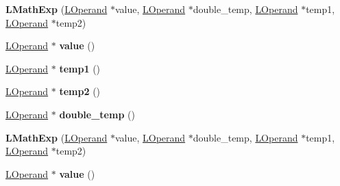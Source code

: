 \begin{DoxyCompactItemize}
\item 
{\bfseries L\+Math\+Exp} (\hyperlink{classv8_1_1internal_1_1_l_operand}{L\+Operand} $\ast$value, \hyperlink{classv8_1_1internal_1_1_l_operand}{L\+Operand} $\ast$double\+\_\+temp, \hyperlink{classv8_1_1internal_1_1_l_operand}{L\+Operand} $\ast$temp1, \hyperlink{classv8_1_1internal_1_1_l_operand}{L\+Operand} $\ast$temp2)\hypertarget{classv8_1_1internal_1_1_l_math_exp_a558e5fb429ca96f45fce9f078a8fa0f6}{}\label{classv8_1_1internal_1_1_l_math_exp_a558e5fb429ca96f45fce9f078a8fa0f6}

\item 
\hyperlink{classv8_1_1internal_1_1_l_operand}{L\+Operand} $\ast$ {\bfseries value} ()\hypertarget{classv8_1_1internal_1_1_l_math_exp_a59d6185f1b9e035a269046376b4432b8}{}\label{classv8_1_1internal_1_1_l_math_exp_a59d6185f1b9e035a269046376b4432b8}

\item 
\hyperlink{classv8_1_1internal_1_1_l_operand}{L\+Operand} $\ast$ {\bfseries temp1} ()\hypertarget{classv8_1_1internal_1_1_l_math_exp_a430c8c030cbaad33b264a77b03e0db75}{}\label{classv8_1_1internal_1_1_l_math_exp_a430c8c030cbaad33b264a77b03e0db75}

\item 
\hyperlink{classv8_1_1internal_1_1_l_operand}{L\+Operand} $\ast$ {\bfseries temp2} ()\hypertarget{classv8_1_1internal_1_1_l_math_exp_adb7bff0a3a668396d3393908dab289df}{}\label{classv8_1_1internal_1_1_l_math_exp_adb7bff0a3a668396d3393908dab289df}

\item 
\hyperlink{classv8_1_1internal_1_1_l_operand}{L\+Operand} $\ast$ {\bfseries double\+\_\+temp} ()\hypertarget{classv8_1_1internal_1_1_l_math_exp_a60d7d35b6ddd8f46774958dce30597dc}{}\label{classv8_1_1internal_1_1_l_math_exp_a60d7d35b6ddd8f46774958dce30597dc}

\item 
{\bfseries L\+Math\+Exp} (\hyperlink{classv8_1_1internal_1_1_l_operand}{L\+Operand} $\ast$value, \hyperlink{classv8_1_1internal_1_1_l_operand}{L\+Operand} $\ast$double\+\_\+temp, \hyperlink{classv8_1_1internal_1_1_l_operand}{L\+Operand} $\ast$temp1, \hyperlink{classv8_1_1internal_1_1_l_operand}{L\+Operand} $\ast$temp2)\hypertarget{classv8_1_1internal_1_1_l_math_exp_a558e5fb429ca96f45fce9f078a8fa0f6}{}\label{classv8_1_1internal_1_1_l_math_exp_a558e5fb429ca96f45fce9f078a8fa0f6}

\item 
\hyperlink{classv8_1_1internal_1_1_l_operand}{L\+Operand} $\ast$ {\bfseries value} ()\hypertarget{classv8_1_1internal_1_1_l_math_exp_a59d6185f1b9e035a269046376b4432b8}{}\label{classv8_1_1internal_1_1_l_math_exp_a59d6185f1b9e035a269046376b4432b8}


\end{DoxyCompactItemize}
